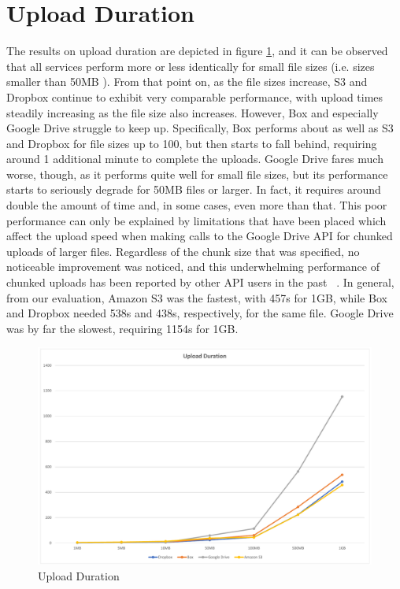\section{Upload Duration}
The results on upload duration are depicted in figure \ref{fig:upload_duration}, and it can be observed that all services perform more or less identically for small file sizes (i.e. sizes smaller than 50MB ). From that point on,  as the file sizes increase, S3 and Dropbox continue to exhibit very comparable performance, with upload times steadily increasing as the file size also increases.  However, Box and especially Google Drive struggle to keep up. Specifically, Box performs about as well as S3 and Dropbox for file sizes up to 100, but then starts to fall behind, requiring around 1 additional minute to complete the uploads. Google Drive fares much worse, though, as it performs quite well for small file sizes, but its performance starts to seriously degrade for 50MB files or larger. In fact, it requires around double the amount of time and, in some cases, even more than that. This poor performance can only be explained by limitations that have been placed which affect the  upload speed when making calls to the Google Drive API for chunked uploads of larger files. Regardless of the chunk size that was specified, no noticeable improvement was noticed, and this underwhelming performance of chunked uploads has been reported by other API users in the past ~\cite{drive_chunked_performance}. In general, from our evaluation, Amazon S3 was the fastest, with 457s for 1GB, while Box and Dropbox needed 538s and 438s, respectively, for the same file. Google Drive was by far the slowest, requiring 1154s for 1GB.

\begin{figure} [!h]
	\centering
	\includegraphics[scale=0.5]{images/upload_chart}
	\caption{\label{fig:upload_duration}Upload Duration}
\end{figure}

